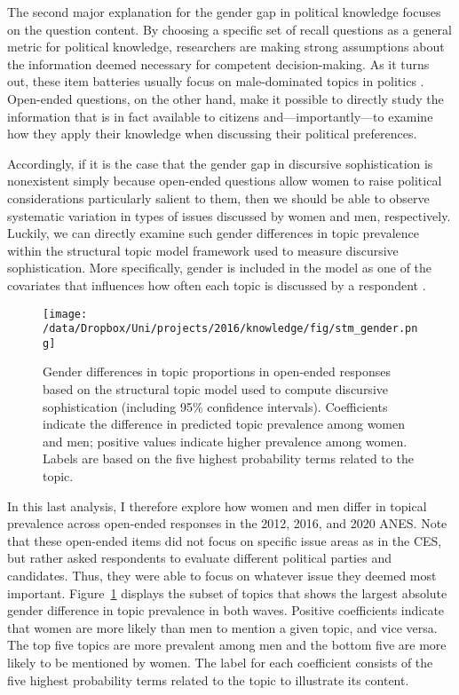 
The second major explanation for the gender gap in political knowledge focuses on the question content. By choosing a specific set of recall questions as a general metric for political knowledge, researchers are making strong assumptions about the information deemed necessary for competent decision-making. As it turns out, these item batteries usually focus on male-dominated topics in politics \citep{dolan2011women}. Open-ended questions, on the other hand, make it possible to directly study the information that is in fact available to citizens and---importantly---to examine how they apply their knowledge when discussing their political preferences.

Accordingly, if it is the case that the gender gap in discursive sophistication is nonexistent simply because open-ended questions allow women to raise political considerations particularly salient to them, then we should be able to observe systematic variation in types of issues discussed by women and men, respectively. Luckily, we can directly examine such gender differences in topic prevalence within the structural topic model framework used to measure discursive sophistication. More specifically, gender is included in the model as one of the covariates that influences how often each topic is discussed by a respondent \citep[see also][for details]{roberts2014structural}.

\begin{figure}[ht]\centering
\texttt{[image: /data/Dropbox/Uni/projects/2016/knowledge/fig/stm\_gender.png]}
\caption[Gender differences in topic proprtions in open-ended responses]{Gender differences in topic proportions in open-ended responses based on the structural topic model used to compute discursive sophistication (including 95\% confidence intervals). Coefficients indicate the difference in predicted topic prevalence among women and men; positive values indicate higher prevalence among women. Labels are based on the five highest probability terms related to the topic.
}\label{fig:stm_gender}
\end{figure}

In this last analysis, I therefore explore how women and men differ in topical prevalence across open-ended responses in the 2012, 2016, and 2020 ANES. Note that these open-ended items did not focus on specific issue areas as in the CES, but rather asked respondents to evaluate different political parties and candidates. Thus, they were able to focus on whatever issue they deemed most important. Figure~\ref{fig:stm_gender} displays the subset of topics that shows the largest absolute gender difference in topic prevalence in both waves. Positive coefficients indicate that women are more likely than men to mention a given topic, and vice versa. The top five topics are more prevalent among men and the bottom five are more likely to be mentioned by women. The label for each coefficient consists of the five highest probability terms related to the topic to illustrate its content.


